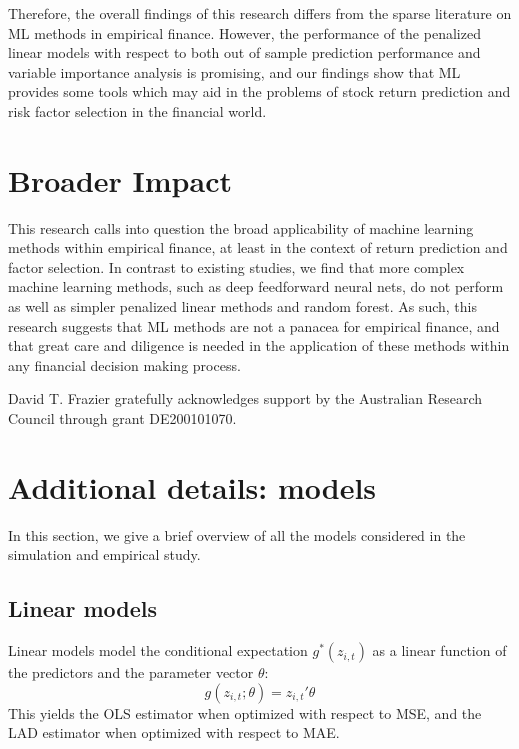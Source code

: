 \documentclass{article}
\begin{document}
Therefore, the overall findings of this research differs from the sparse literature on ML methods in empirical finance. However, the performance of the penalized linear models with respect to both out of sample prediction performance and variable importance analysis is promising, and our findings show that ML provides some tools which may aid in the problems of stock return prediction and risk factor selection in the financial world. 

\section*{Broader Impact}
This research calls into question the broad applicability of machine learning methods within empirical finance, at least in the context of return prediction and factor selection. In contrast to existing studies, we find that more complex machine learning methods, such as deep feedforward neural nets, do not perform as well as simpler penalized linear methods and random forest. As such, this research suggests that ML methods are not a panacea for empirical finance, and that great care and diligence is needed in the application of these methods within any financial decision making process. 

\begin{ack}
	David T. Frazier gratefully acknowledges support by the Australian Research Council through grant DE200101070.
\end{ack}




\appendix 

\section{Additional details: models}\label{app:models}
In this section, we give a brief overview of all the models considered in the simulation and empirical study.

\subsection{Linear models}
Linear models model the conditional expectation \( g^*(z_{i, t}) \) as a linear function of the predictors and the parameter vector \( \theta \):
\begin{equation}
g(z_{i, t};\theta) = z_{i, t}' \theta
\end{equation}
This yields the OLS estimator when optimized with respect to MSE, and the LAD estimator when optimized with respect to MAE.
\end{document}

